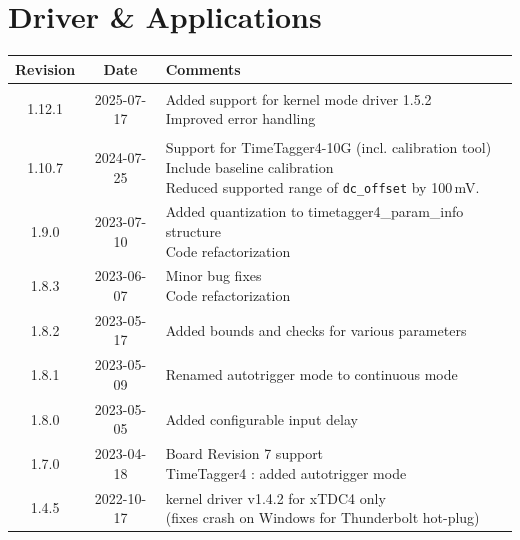 \section{Driver \& Applications} \label{sec:rev_driver_applications}
\begin{tabularx}{\textwidth}{|c|c|X|}
    \hline
    Revision & Date & Comments\\
    \hline\hline
    \hypertarget{drvrev}{1.12.1} & 2025-07-17 &
    \makecell[l] {
        Added support for kernel mode driver 1.5.2\\*
        Improved error handling
    }\\   
    \hline
    1.10.7 & 2024-07-25 &
    \makecell[l] {
        Support for TimeTagger4-10G (incl. calibration tool)\\*
        Include baseline calibration\\*
        Reduced supported range of \texttt{dc\_offset} by 100\,mV.
    }\\   
    \hline
    1.9.0 & 2023-07-10 &
    \makecell[l] {
       Added quantization to timetagger4\_param\_info structure \\*
       Code refactorization\\*   
    }\\   
    \hline
    {1.8.3} & 2023-06-07 &
    \makecell[l] {
        Minor bug fixes\\*
        Code refactorization\\*        
    }\\
    \hline
    {1.8.2} & 2023-05-17 &
    \makecell[l] {
        Added bounds and checks for various parameters\\*         
    }\\
    \hline
    {1.8.1} & 2023-05-09 &
    \makecell[l] {
     Renamed autotrigger mode to continuous mode  \\*  
    }\\
    \hline
    {1.8.0} & 2023-05-05 &
    \makecell[l] {
        Added configurable input delay\\*
    }\\
    \hline
    {1.7.0} & 2023-04-18 &
    \makecell[l] {
        Board Revision 7 support\\* 
        TimeTagger4 : added autotrigger mode\\*
    }\\
    \hline
    {1.4.5} & 2022-10-17 &
    \makecell[l] {
        kernel driver v1.4.2 for xTDC4 only\\* 
        (fixes crash on Windows for Thunderbolt hot-plug)\\*
}
\end{tabularx}
